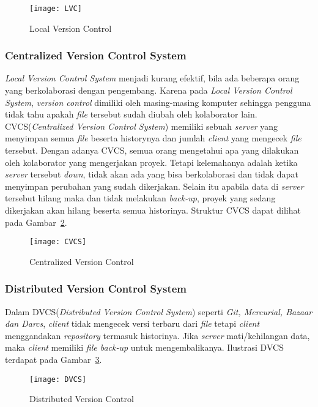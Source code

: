 \begin{figure}[H]
	\centering  
	\texttt{[image: LVC]}  
	\caption[Local Version Control]{Local Version Control}
	\label{fig:LVC} 
\end{figure}

\subsubsection{Centralized Version Control System}
\textit{Local Version Control System} menjadi kurang efektif, bila ada beberapa orang yang berkolaborasi dengan pengembang. Karena pada \textit{Local Version Control System}, \textit{version control} dimiliki oleh masing-masing komputer sehingga pengguna tidak tahu apakah \textit{file} tersebut sudah diubah oleh kolaborator lain. CVCS(\textit{Centralized Version Control System}) memiliki sebuah \textit{server} yang menyimpan semua \textit{file} beserta historynya dan jumlah \textit{client} yang mengecek \textit{file} tersebut. Dengan adanya CVCS, semua orang mengetahui apa yang dilakukan oleh kolaborator yang mengerjakan proyek. Tetapi kelemahanya adalah ketika \textit{server} tersebut \textit{down}, tidak akan ada yang bisa berkolaborasi dan tidak dapat menyimpan perubahan yang sudah dikerjakan. Selain itu apabila data di \textit{server} tersebut hilang maka dan tidak melakukan \textit{back-up}, proyek yang sedang dikerjakan akan hilang beserta semua historinya. Struktur CVCS dapat dilihat pada Gambar~\ref{fig:CVCS}.

\begin{figure}[H]
	\centering  
	\texttt{[image: CVCS]}  
	\caption[Centralized Version Control]{Centralized Version Control}
	\label{fig:CVCS} 
\end{figure}

\subsubsection{Distributed Version Control System}
Dalam DVCS(\textit{Distributed Version Control System}) seperti \textit{Git, Mercurial, Bazaar dan Darcs}, \textit{client} tidak mengecek versi terbaru dari \textit{file} tetapi \textit{client} menggandakan \textit{repository} termasuk historinya. Jika \textit{server} mati/kehilangan data, maka \textit{client} memiliki \textit{file back-up} untuk mengembalikanya.  Ilustrasi DVCS terdapat pada Gambar~\ref{fig:DVCS}.

\begin{figure}[H]
	\centering  
	\texttt{[image: DVCS]}  
	\caption[Distributed Version Control]{Distributed Version Control}
	\label{fig:DVCS} 
\end{figure}

